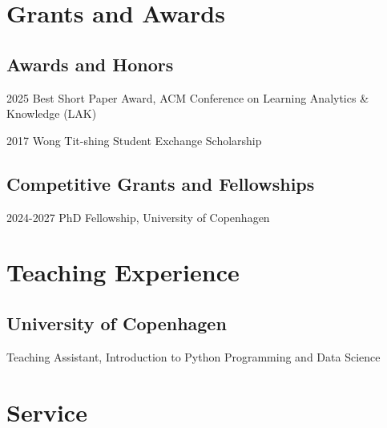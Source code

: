\documentclass[11pt,letterpaper]{report}
\newcommand{\listitemspace}{0.25em}
\renewenvironment{itemize}
{\begin{list}{}{\setlength{\leftmargin}{0em}
                \setlength{\parskip}{0em}
                \setlength{\itemsep}{\listitemspace}
                \setlength{\parsep}{\listitemspace}}}
{\end{list}}
\begin{document}
    \section*{Grants and Awards}

    \subsection*{Awards and Honors}

    \begin{tablist}
        \item[2025] \tab{}Best Short Paper Award, ACM Conference on Learning Analytics \& Knowledge (LAK)
        \item[2017] \tab{}Wong Tit-shing Student Exchange Scholarship
    \end{tablist}

    \subsection*{Competitive Grants and Fellowships}

    \begin{tablist}

        \item[2024-2027] \tab{}PhD Fellowship, University of Copenhagen

    \end{tablist}



    \section*{Teaching Experience}

    \subsection*{University of Copenhagen}

    \begin{itemize}

        \item Teaching Assistant, Introduction to Python Programming and Data Science

    \end{itemize}


    \section*{Service}
\end{document}
